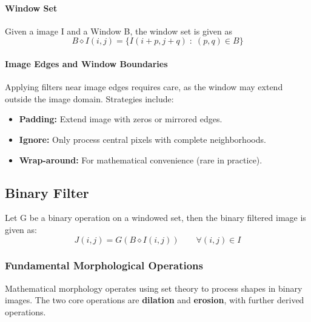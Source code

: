 \paragraph{Window Set} Given a image I and a Window B, the window set is given as 
\[
B \diamond I(i,j) = \{I(i +p, j+q) \; : \; (p,q) \in B\}
\]


\paragraph{Image Edges and Window Boundaries}

Applying filters near image edges requires care, as the window may extend outside the image domain. Strategies include:
\begin{itemize}
    \item \textbf{Padding:} Extend image with zeros or mirrored edges.
    \item \textbf{Ignore:} Only process central pixels with complete neighborhoods.
    \item \textbf{Wrap-around:} For mathematical convenience (rare in practice).
\end{itemize}



\subsection{Binary Filter}


\noindent Let G be a binary operation on a windowed set, then the binary filtered image is given as:
\[
J(i,j) = G(B \diamond I(i,j)) \qquad \forall (i,j) \in I
\]


\subsubsection{Fundamental Morphological Operations}

Mathematical morphology operates using set theory to process shapes in binary images. The two core operations are \textbf{dilation} and \textbf{erosion}, with further derived operations.


